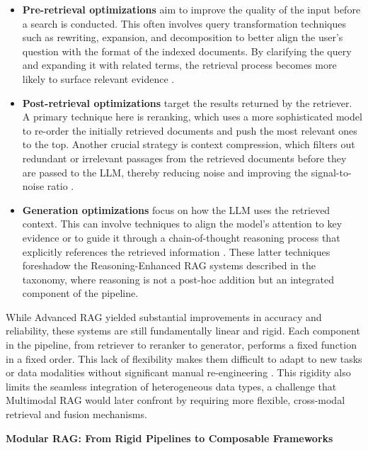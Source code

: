 \documentclass[11pt]{article}
\begin{document}
\begin{itemize}
\item
  \textbf{Pre-retrieval optimizations} aim to improve the quality of the input before a search is conducted. This often involves query transformation techniques such as rewriting, expansion, and decomposition to better align the user's question with the format of the indexed documents. By clarifying the query and expanding it with related terms, the retrieval process becomes more likely to surface relevant evidence \cite{ref23}.
\item
  \textbf{Post-retrieval optimizations} target the results returned by the retriever. A primary technique here is reranking, which uses a more sophisticated model to re-order the initially retrieved documents and push the most relevant ones to the top. Another crucial strategy is context compression, which filters out redundant or irrelevant passages from the retrieved documents before they are passed to the LLM, thereby reducing noise and improving the signal-to-noise ratio \cite{ref23}.
\item
  \textbf{Generation optimizations} focus on how the LLM uses the retrieved context. This can involve techniques to align the model's attention to key evidence or to guide it through a chain-of-thought reasoning process that explicitly references the retrieved information \cite{ref21}. These latter techniques foreshadow the Reasoning-Enhanced RAG systems described in the taxonomy, where reasoning is not a post-hoc addition but an integrated component of the pipeline.
\end{itemize}

While Advanced RAG yielded substantial improvements in accuracy and reliability, these systems are still fundamentally linear and rigid. Each component in the pipeline, from retriever to reranker to generator, performs a fixed function in a fixed order. This lack of flexibility makes them difficult to adapt to new tasks or data modalities without significant manual re-engineering \cite{ref23}. This rigidity also limits the seamless integration of heterogeneous data types, a challenge that Multimodal RAG would later confront by requiring more flexible, cross-modal retrieval and fusion mechanisms.

\textbf{Modular RAG: From Rigid Pipelines to Composable Frameworks}
\end{document}
